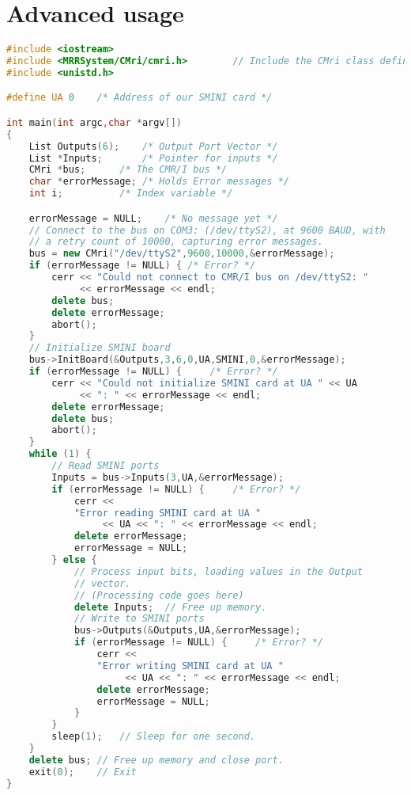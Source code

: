 \section{Advanced usage}
\begin{lstlisting}[caption={Using the CMR/I from C++, more realistic version},
		   language=C++,
		   label=lst:CMRI:Cpp2]
#include <iostream>
#include <MRRSystem/CMri/cmri.h>        // Include the CMri class definition
#include <unistd.h>

#define UA 0    /* Address of our SMINI card */

int main(int argc,char *argv[])
{
	List Outputs(6);	/* Output Port Vector */
	List *Inputs;		/* Pointer for inputs */
	CMri *bus;		/* The CMR/I bus */
	char *errorMessage;	/* Holds Error messages */
	int i;			/* Index variable */

	errorMessage = NULL;	/* No message yet */
	// Connect to the bus on COM3: (/dev/ttyS2), at 9600 BAUD, with
	// a retry count of 10000, capturing error messages.
	bus = new CMri("/dev/ttyS2",9600,10000,&errorMessage);
	if (errorMessage != NULL) {	/* Error? */
		cerr << "Could not connect to CMR/I bus on /dev/ttyS2: " 
		     << errorMessage << endl;
		delete bus;
		delete errorMessage;
		abort();
	}
	// Initialize SMINI board
	bus->InitBoard(&Outputs,3,6,0,UA,SMINI,0,&errorMessage);
	if (errorMessage != NULL) {     /* Error? */  
		cerr << "Could not initialize SMINI card at UA " << UA
		     << ": " << errorMessage << endl;
		delete errorMessage;
		delete bus;
		abort();
	}
	while (1) {
		// Read SMINI ports
		Inputs = bus->Inputs(3,UA,&errorMessage);
		if (errorMessage != NULL) {     /* Error? */
			cerr <<
			"Error reading SMINI card at UA "
			     << UA << ": " << errorMessage << endl;
			delete errorMessage;
			errorMessage = NULL;
		} else {
			// Process input bits, loading values in the Output
			// vector.
			// (Processing code goes here)
			delete Inputs; 	// Free up memory.
			// Write to SMINI ports
			bus->Outputs(&Outputs,UA,&errorMessage);
			if (errorMessage != NULL) {     /* Error? */
				cerr << 
				"Error writing SMINI card at UA " 
				     << UA << ": " << errorMessage << endl;
				delete errorMessage;
				errorMessage = NULL;
			}
		}
		sleep(1);	// Sleep for one second.
	}
	delete bus;	// Free up memory and close port.
	exit(0);	// Exit
}
\end{lstlisting}
